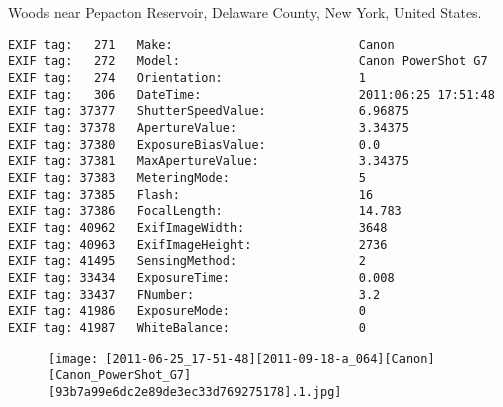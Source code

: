 \section{\protect{}}
\noindent Woods near Pepacton Reservoir, Delaware County, New York, United States.
\noindent
\begin{lstlisting}
EXIF tag:   271   Make:                          Canon
EXIF tag:   272   Model:                         Canon PowerShot G7
EXIF tag:   274   Orientation:                   1
EXIF tag:   306   DateTime:                      2011:06:25 17:51:48
EXIF tag: 37377   ShutterSpeedValue:             6.96875
EXIF tag: 37378   ApertureValue:                 3.34375
EXIF tag: 37380   ExposureBiasValue:             0.0
EXIF tag: 37381   MaxApertureValue:              3.34375
EXIF tag: 37383   MeteringMode:                  5
EXIF tag: 37385   Flash:                         16
EXIF tag: 37386   FocalLength:                   14.783
EXIF tag: 40962   ExifImageWidth:                3648
EXIF tag: 40963   ExifImageHeight:               2736
EXIF tag: 41495   SensingMethod:                 2
EXIF tag: 33434   ExposureTime:                  0.008
EXIF tag: 33437   FNumber:                       3.2
EXIF tag: 41986   ExposureMode:                  0
EXIF tag: 41987   WhiteBalance:                  0

\end{lstlisting}
\clearpage
\begin{figure}
\raggedleft
\texttt{[image: [2011-06-25\_17-51-48][2011-09-18-a\_064][Canon][Canon\_PowerShot\_G7][93b7a99e6dc2e89de3ec33d769275178].1.jpg]}
\end{figure}


\clearpage
